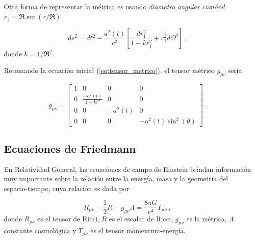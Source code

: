 Otra forma de representar la métrica es usando \textit{diametro angular comóvil} $r_{1}=\Re\sin(r/\Re)$

\begin{equation}
ds^{2}=dt^{2}-\frac{a^{2}(t)}{c^{2}}\left[\frac{dr^{2}_{1}}{1-kr^{2}_{1}}+r^{2}_{1}d\Omega^{2}\right]\,,
\end{equation}
%
donde $k=1/\Re^{2}$.

Retomando la ecuación inicial (\ref{eq:tensor_metrico}), el tensor métrico $g_{\mu\nu}$ sería




\begin{equation}
g_{\mu\nu}=
\begin{bmatrix}
1 & 0 & 0 & 0 \\ 
0 & \frac{-a^{2}(t)}{1-kr^{2}} & 0 & 0 \\ 
0 & 0 & -a^{2}(t)  & 0 \\ 
0 & 0 & 0 & -a^{2}(t)\sin^{2}(\theta)
\end{bmatrix}\,.
\end{equation}


\subsection{Ecuaciones de Friedmann}
\label{subsec:Ecuaciones_Friedmann}

En Relatividad General, las ecuaciones de campo de Einstein brindan información muy importante sobre la relación entre la energía, masa y la geometría del espacio-tiempo, cuya relación es dada por 

\begin{equation}
R_{\mu\nu}-\frac{1}{2}R-g_{\mu\nu}\Lambda=\frac{8\pi G}{c^{4}}T_{\mu\nu} \,,
\label{eq:Einstein_campo_ecuacion}
\end{equation}
%
donde $R_{\mu\nu}$ es el tensor de Ricci, $R$ es el escalar de Ricci, $g_{\mu\nu}$ es la métrica, $\Lambda$ constante cosmológica y $T_{\mu\nu}$ es el tensor momentum-energía. 

